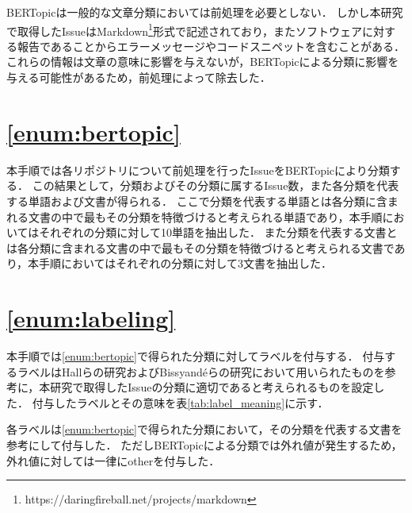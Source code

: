 \documentclass[main]{subfiles}
\begin{document}
BERTopicは一般的な文章分類においては前処理を必要としない．
しかし本研究で取得したIssueはMarkdown\footnote{https://daringfireball.net/projects/markdown}形式で記述されており，またソフトウェアに対する報告であることからエラーメッセージやコードスニペットを含むことがある．
これらの情報は文章の意味に影響を与えないが，BERTopicによる分類に影響を与える可能性があるため，前処理によって除去した．


\section{\ref{enum:bertopic}}
\label{sec:bertopic}

本手順では各リポジトリについて前処理を行ったIssueをBERTopicにより分類する．
この結果として，分類およびその分類に属するIssue数，また各分類を代表する単語および文書が得られる．
ここで分類を代表する単語とは各分類に含まれる文書の中で最もその分類を特徴づけると考えられる単語であり，本手順においてはそれぞれの分類に対して10単語を抽出した．
また分類を代表する文書とは各分類に含まれる文書の中で最もその分類を特徴づけると考えられる文書であり，本手順においてはそれぞれの分類に対して3文書を抽出した．


\section{\ref{enum:labeling}}
\label{sec:labeling}

本手順では\ref{enum:bertopic}で得られた分類に対してラベルを付与する．
付与するラベルはHallらの研究\cite{hall:2001}およびBissyand{\'e}らの研究\cite{bissyande:2013}において用いられたものを参考に，本研究で取得したIssueの分類に適切であると考えられるものを設定した．
付与したラベルとその意味を表\ref{tab:label_meaning}に示す．



各ラベルは\ref{enum:bertopic}で得られた分類において，その分類を代表する文書を参考にして付与した．
ただしBERTopicによる分類では外れ値が発生するため，外れ値に対しては一律にotherを付与した．

\end{document}
